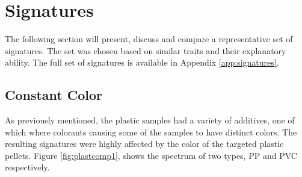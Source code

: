 \section{Signatures}
The following section will present, discuss and compare a representative set of signatures. The set was chosen based on similar traits and their explanatory ability. The full set of signatures is available in Appendix \ref{app:signatures}.

\subsection{Constant Color}
As previously mentioned, the plastic samples had a variety of additives, one of which where colorants causing some of the samples to have distinct colors. The resulting signatures were highly affected by the color of the targeted plastic pellets. Figure \ref{fig:plastcomp1}, shows the spectrum of two types, PP and PVC respectively. 

